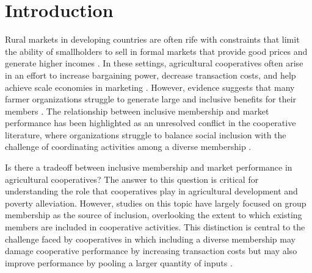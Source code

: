 \documentclass[11pt]{article}
\begin{document}
\clearpage
\renewcommand{\cftsecleader}{\cftdotfill{\cftdotsep}}

\tableofcontents
\clearpage

\doublespacing
\thispagestyle{plain}
\setcounter{page}{1}

\section{Introduction} \label{sec:intro}
Rural markets in developing countries are often rife with constraints that limit the ability of smallholders to sell in formal markets that provide good prices and generate higher incomes \citep{ashby_investing_nodate,p_kristjanson_notitle_2014}. In these settings, agricultural cooperatives often arise in an effort to increase bargaining power, decrease transaction costs, and help achieve scale economies in marketing \citep{markelova_collective_2010,rondot_agricultural_2001,staal_smallholder_1997,csaki_reaching_2003}. However, evidence suggests that many farmer organizations struggle to generate large and inclusive benefits for their members \citep{bernard_reaching_2009, casaburi_loyalty_2015,poole_review_2010}. The relationship between inclusive membership and market performance has been highlighted as an unresolved conflict in the cooperative literature, where organizations struggle to balance social inclusion with the challenge of coordinating activities among a diverse membership \citep{bernard_reaching_2009,world_bank_world_2008}. 

Is there a tradeoff between inclusive membership and market performance in agricultural cooperatives? The answer to this question is critical for understanding the role that cooperatives play in agricultural development and poverty alleviation. However, studies on this topic have largely focused on group membership as the source of inclusion, overlooking the extent to which existing members are included in cooperative activities. This distinction is central to the challenge faced by cooperatives in which including a diverse membership may damage cooperative performance by increasing transaction costs \citep{world_bank_world_2008} but may also improve performance by pooling a larger quantity of inputs \citep{aflagah_cheap_2019}. 
\end{document}
